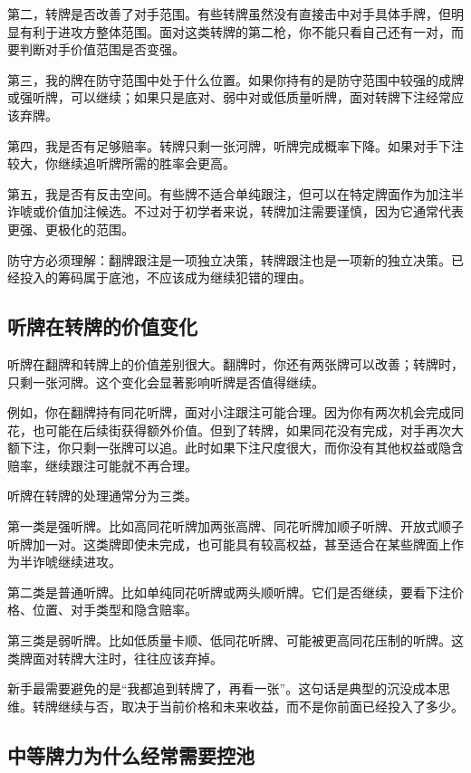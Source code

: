 第二，转牌是否改善了对手范围。有些转牌虽然没有直接击中对手具体手牌，但明显有利于进攻方整体范围。面对这类转牌的第二枪，你不能只看自己还有一对，而要判断对手价值范围是否变强。

第三，我的牌在防守范围中处于什么位置。如果你持有的是防守范围中较强的成牌或强听牌，可以继续；如果只是底对、弱中对或低质量听牌，面对转牌下注经常应该弃牌。

第四，我是否有足够赔率。转牌只剩一张河牌，听牌完成概率下降。如果对手下注较大，你继续追听牌所需的胜率会更高。

第五，我是否有反击空间。有些牌不适合单纯跟注，但可以在特定牌面作为加注半诈唬或价值加注候选。不过对于初学者来说，转牌加注需要谨慎，因为它通常代表更强、更极化的范围。

防守方必须理解：翻牌跟注是一项独立决策，转牌跟注也是一项新的独立决策。已经投入的筹码属于底池，不应该成为继续犯错的理由。

\subsection{听牌在转牌的价值变化}

听牌在翻牌和转牌上的价值差别很大。翻牌时，你还有两张牌可以改善；转牌时，只剩一张河牌。这个变化会显著影响听牌是否值得继续。

例如，你在翻牌持有同花听牌，面对小注跟注可能合理。因为你有两次机会完成同花，也可能在后续街获得额外价值。但到了转牌，如果同花没有完成，对手再次大额下注，你只剩一张牌可以追。此时如果下注尺度很大，而你没有其他权益或隐含赔率，继续跟注可能就不再合理。

听牌在转牌的处理通常分为三类。

第一类是强听牌。比如高同花听牌加两张高牌、同花听牌加顺子听牌、开放式顺子听牌加一对。这类牌即使未完成，也可能具有较高权益，甚至适合在某些牌面上作为半诈唬继续进攻。

第二类是普通听牌。比如单纯同花听牌或两头顺听牌。它们是否继续，要看下注价格、位置、对手类型和隐含赔率。

第三类是弱听牌。比如低质量卡顺、低同花听牌、可能被更高同花压制的听牌。这类牌面对转牌大注时，往往应该弃掉。

新手最需要避免的是“我都追到转牌了，再看一张”。这句话是典型的沉没成本思维。转牌继续与否，取决于当前价格和未来收益，而不是你前面已经投入了多少。

\subsection{中等牌力为什么经常需要控池}

